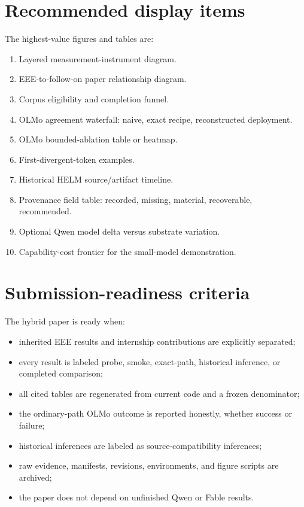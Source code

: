 \documentclass[11pt]{article}
\begin{document}
\section{Recommended display items}

The highest-value figures and tables are:

\begin{enumerate}
  \item Layered measurement-instrument diagram.
  \item EEE-to-follow-on paper relationship diagram.
  \item Corpus eligibility and completion funnel.
  \item OLMo agreement waterfall: naive, exact recipe, reconstructed deployment.
  \item OLMo bounded-ablation table or heatmap.
  \item First-divergent-token examples.
  \item Historical HELM source/artifact timeline.
  \item Provenance field table: recorded, missing, material, recoverable, recommended.
  \item Optional Qwen model delta versus substrate variation.
  \item Capability-cost frontier for the small-model demonstration.
\end{enumerate}

\section{Submission-readiness criteria}

The hybrid paper is ready when:

\begin{itemize}
  \item inherited EEE results and internship contributions are explicitly separated;
  \item every result is labeled probe, smoke, exact-path, historical inference, or completed comparison;
  \item all cited tables are regenerated from current code and a frozen denominator;
  \item the ordinary-path OLMo outcome is reported honestly, whether success or failure;
  \item historical inferences are labeled as source-compatibility inferences;
  \item raw evidence, manifests, revisions, environments, and figure scripts are archived;
  \item the paper does not depend on unfinished Qwen or Fable results.
\end{itemize}
\end{document}
